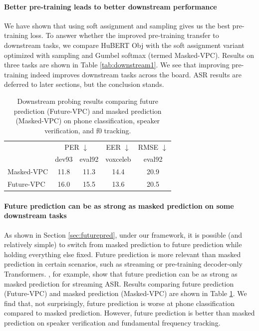 \documentclass[11pt,a4paper]{article}
\begin{document}
\paragraph{Better pre-training leads to better downstream performance}

We have shown that using soft assignment and sampling gives us the best pre-training loss.
To answer whether the improved pre-training transfer to downstream tasks,
we compare HuBERT Obj with the soft assignment variant optimized with sampling and Gumbel softmax (termed Masked-VPC).
Results on three tasks are shown in Table \ref{tab:downstream1}.
We see that improving pre-training indeed improves downstream tasks across the board.
ASR results are deferred to later sections, but the conclusion stands.

%
%
%
%
%
%
%
%
%

\begin{table}
    \caption{Downstream probing results comparing future prediction (Future-VPC) and masked prediction (Masked-VPC) on phone classification, speaker verification, and f0 tracking.}
    \label{tab:downstream2}
    \centering
    \footnotesize
    \begin{tabularx}{0.98\linewidth}{lcccc}
        \toprule
           &\multicolumn{2}{c}{PER $\downarrow$} &EER $\downarrow$ &RMSE $\downarrow$  \\
           &dev93 &eval92 &voxceleb &eval92  \\[1pt]
        \midrule                                                                                                                 
        Masked-VPC          &11.8          &11.3           &14.4     &20.9  \\
        Future-VPC          &16.0          &15.5           &13.6     &20.5  \\
        \bottomrule
    \end{tabularx}
\end{table}

\paragraph{Future prediction can be as strong as masked prediction on some downstream tasks}

As shown in Section \ref{sec:futurepred}, under our framework, it is possible (and relatively simple) to switch from masked prediction to future prediction while holding everything else fixed.
Future prediction is more relevant than masked prediction in certain scenarios, such as streaming or pre-training decoder-only Transformers.
\citet{misra21_interspeech}, for example, show that future prediction can be as strong as masked prediction for streaming ASR.
Results comparing future prediction (Future-VPC) and masked prediction (Masked-VPC) are shown in Table \ref{tab:downstream2}.
We find that, not surprisingly, future prediction is worse at phone classification compared to masked prediction.
However, future prediction is better than masked prediction on speaker verification and fundamental frequency tracking.
\end{document}

